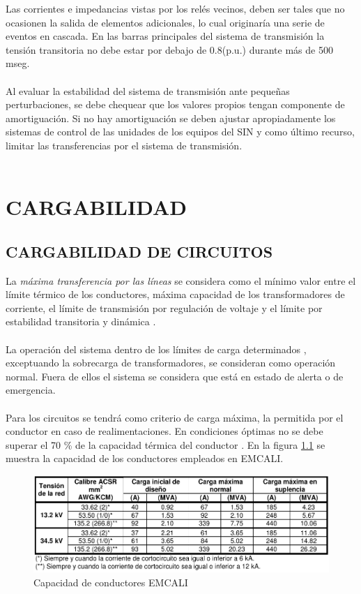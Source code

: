 \documentclass[a5paper]{book}%
\begin{document}
	
 Las corrientes e impedancias vistas por los relés vecinos, deben
  ser tales que no ocasionen la salida de elementos adicionales, lo
  cual originaría una serie de eventos en cascada.  En las barras
  principales del sistema de transmisión la tensión transitoria no
  debe estar por debajo de 0.8(p.u.) durante más de 500 mseg.\\\\
	
 Al evaluar la estabilidad del sistema de transmisión ante
  pequeñas perturbaciones, se debe chequear que los valores propios
  tengan componente de amortiguación. Si no hay amortiguación se deben
  ajustar apropiadamente los sistemas de control de las unidades de
  los equipos del SIN y como último recurso, limitar las
  transferencias por el sistema de transmisión.\\\\

  
\chapter{CARGABILIDAD}
\section{CARGABILIDAD DE CIRCUITOS}
 La \textit{máxima transferencia por las líneas} se considera
  como el mínimo valor entre el límite térmico de los conductores,
  máxima capacidad de los transformadores de corriente, el límite de
  transmisión por regulación de voltaje y el límite por estabilidad
  transitoria y dinámica \cite{CREG0251995}.\\\\

  La operación del sistema dentro de los límites de carga
  determinados , exceptuando la sobrecarga de
  transformadores, se consideran como operación normal. Fuera de ellos
  el sistema se considera que está en estado de alerta o de
  emergencia.\\\\
  
Para los circuitos se tendrá como criterio de carga máxima, la
permitida por el conductor en caso de realimentaciones. En condiciones
óptimas  no se debe superar el 70 \% de la capacidad térmica del
conductor \cite{MANOPEMCALI}. En la figura \ref{fig:capacidad_conductores_emcali} se
muestra la capacidad de los conductores empleados en EMCALI.

\begin{figure}[H]
  \centering
  \caption{Capacidad de conductores EMCALI}
  \label{fig:capacidad_conductores_emcali}
  \includegraphics[width=\linewidth]{aereos_emcali}
\end{figure}
\end{document}
